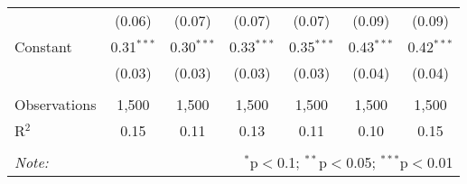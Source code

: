\documentclass[
]{article}
\begin{document}
\begin{sidewaystable}[!htbp]
\begin{tabular}{@{\extracolsep{1pt}}lcccccc}
  & (0.06) & (0.07) & (0.07) & (0.07) & (0.09) & (0.09) \\ 
  Constant & 0.31$^{***}$ & 0.30$^{***}$ & 0.33$^{***}$ & 0.35$^{***}$ & 0.43$^{***}$ & 0.42$^{***}$ \\ 
  & (0.03) & (0.03) & (0.03) & (0.03) & (0.04) & (0.04) \\ 
 \hline \\[-1.8ex] 
Observations & 1,500 & 1,500 & 1,500 & 1,500 & 1,500 & 1,500 \\ 
R$^{2}$ & 0.15 & 0.11 & 0.13 & 0.11 & 0.10 & 0.15 \\ 
\hline 
\hline \\[-1.8ex] 
\textit{Note:}  & \multicolumn{6}{r}{$^{*}$p$<$0.1; $^{**}$p$<$0.05; $^{***}$p$<$0.01} \\ 
\end{tabular} 
\end{sidewaystable}
\end{document}
